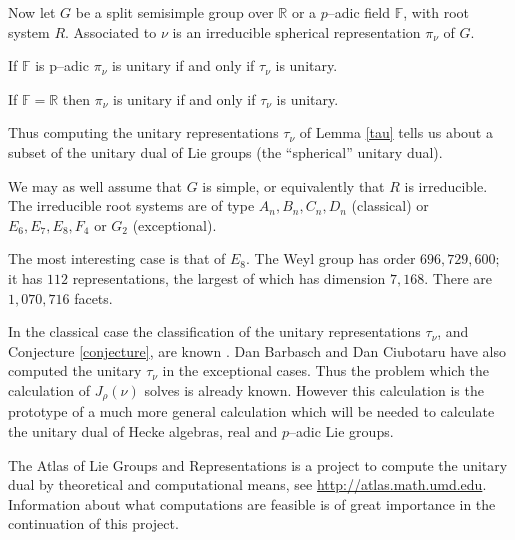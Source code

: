 Now let $G$ be a split semisimple group over $\mathbb R$ or a $p$--adic
field $\mathbb F$, with root system
$R$.  Associated to $\nu$ is an irreducible spherical representation
$\pi_\nu$ of $G$.

\begin{lemma}
\label{padic}
If $\mathbb F$ is p--adic $\pi_\nu$ is unitary if and only if $\tau_\nu$ is unitary.
\end{lemma}

\begin{conjecture}
\label{conjecture}
If $\mathbb F=\mathbb R$ then $\pi_\nu$ is unitary if and only if
$\tau_\nu$ is unitary.
\end{conjecture}

Thus computing the unitary representations $\tau_\nu$ of Lemma
\ref{tau} tells us about a subset of the unitary dual of Lie groups
(the ``spherical'' unitary dual).

We may as well assume that $G$ is simple, or equivalently that $R$ is
irreducible. The irreducible root systems are of type
$A_n,B_n,C_n,D_n$ (classical) or $E_6,E_7,E_8, F_4$
or $G_2$ (exceptional).

The most interesting case is that of $E_8$.  The Weyl group has order
$696,729,600$; it has $112$ representations, the largest of which
has dimension $7,168$.  There are $1,070,716$ facets.

In the classical case the classification of the unitary
representations $\tau_\nu$, and Conjecture \ref{conjecture},
are known \cite{barbasch_spherical}.
Dan Barbasch and Dan Ciubotaru have also computed the unitary
$\tau_\nu$ in the exceptional cases.
Thus the problem which the calculation of $J_\rho(\nu)$ solves is
already known. However this calculation is the prototype of a much
more general calculation which will be needed to calculate the unitary
dual of Hecke algebras, real and $p$--adic Lie groups.

The Atlas of Lie Groups and Representations 
is a project to compute  the unitary dual by theoretical and computational
means, see \url{http://atlas.math.umd.edu}. 
Information about what computations are feasible is of
great importance in the continuation of this project.




